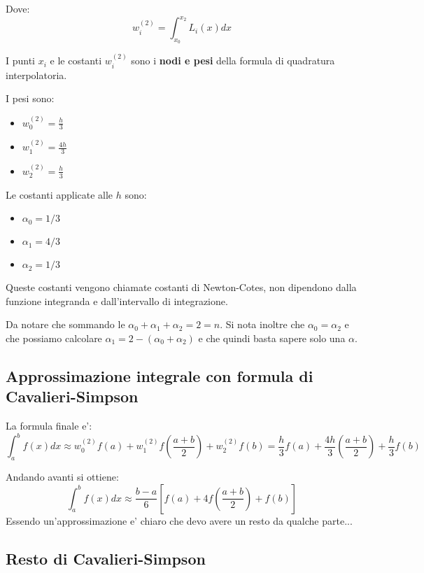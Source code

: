 Dove:
\begin{equation}
  w_i^{(2)} = \int_{x_0}^{x_2} L_i(x)dx
\end{equation}


I punti $x_i$ e le costanti $w_i^{(2)}$ sono i \textbf{nodi e pesi} della formula di quadratura interpolatoria.

I pesi sono:
\begin{itemize}
  \item $w_0^{(2)} = \frac{h}{3}$
  \item $w_1^{(2)} = \frac{4h}{3}$
  \item $w_2^{(2)} = \frac{h}{3}$
\end{itemize}

Le costanti applicate alle $h$ sono:
\begin{itemize}
  \item $\alpha_0 = 1/3$
  \item $\alpha_1 = 4/3$
  \item $\alpha_2 = 1/3$
\end{itemize}

Queste costanti vengono chiamate costanti di Newton-Cotes, non dipendono dalla funzione integranda e dall'intervallo di integrazione.

Da notare che sommando le $\alpha_0 + \alpha_1 + \alpha_2 = 2 = n$.
Si nota inoltre che $\alpha_0 = \alpha_2$ e che possiamo calcolare $\alpha_1 = 2 - (\alpha_0 + \alpha_2)$ e che quindi basta sapere solo una $\alpha$.
\subsection{Approssimazione integrale con formula di Cavalieri-Simpson}
La formula finale e':
\begin{equation}
  \int_a^b f(x)dx \approx w_0^{(2)}f(a) + w_1^{(2)}f(\frac{a+b}{2}) + w_2^{(2)}f(b) = \frac{h}{3}f(a) + \frac{4h}{3}(\frac{a+b}{2}) + \frac{h}{3}f(b)
\end{equation}

Andando avanti si ottiene:
\begin{equation}
  \int_a^b f(x)dx \approx \frac{b-a}{6}[f(a) + 4f(\frac{a+b}{2}) + f(b)]
\end{equation}
Essendo un'approssimazione e' chiaro che devo avere un resto da qualche parte...

\subsection{Resto di Cavalieri-Simpson}




